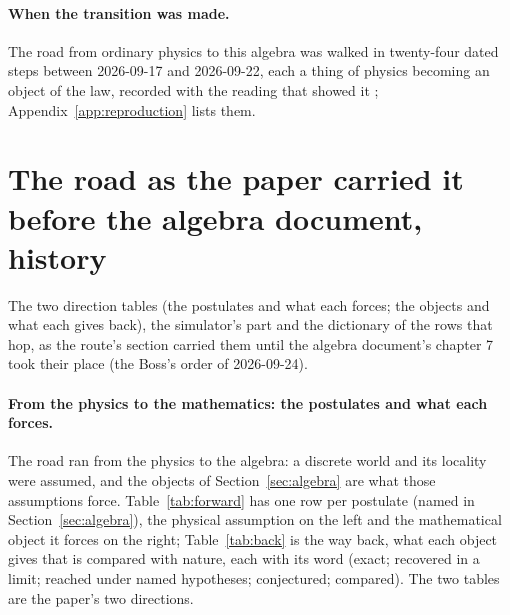 \paragraph{When the transition was made.} The road from ordinary physics to this algebra was walked in twenty-four dated steps between 2026-09-17 and 2026-09-22, each a thing of physics becoming an object of the law, recorded with the reading that showed it \cite{history}; Appendix~\ref{app:reproduction} lists them. 
\section{The road as the paper carried it before the algebra document, history}\label{rec:oldroute}

The two direction tables (the postulates and what each forces; the objects and what each gives back), the simulator's part and the dictionary of the rows that hop, as the route's section carried them until the algebra document's chapter 7 took their place (the Boss's order of 2026-09-24).

\paragraph{From the physics to the mathematics: the postulates and what each forces.} The road ran from the physics to the algebra: a discrete world and its locality were assumed, and the objects of Section~\ref{sec:algebra} are what those assumptions force. Table~\ref{tab:forward} has one row per postulate (named in Section~\ref{sec:algebra}), the physical assumption on the left and the mathematical object it forces on the right; Table~\ref{tab:back} is the way back, what each object gives that is compared with nature, each with its word (exact; recovered in a limit; reached under named hypotheses; conjectured; compared). The two tables are the paper's two directions.

